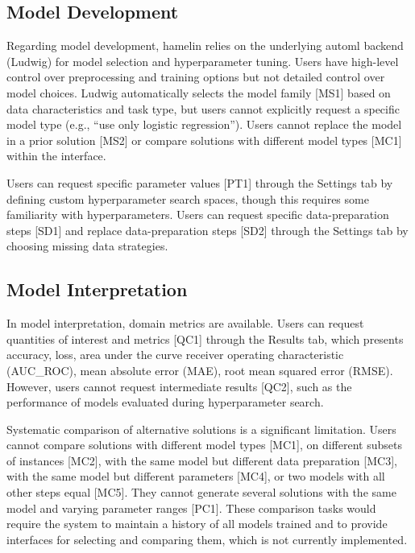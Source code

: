 \documentclass[conference,onecolumn]{IEEEtran}
\begin{document}
\subsection{Model Development}
  
Regarding model development, \gls{hamelin} relies on the underlying \gls{automl} backend (Ludwig) for model selection and hyperparameter tuning. Users have high-level control over preprocessing and training options but not detailed control over model choices. Ludwig automatically selects the model family [MS1] based on data characteristics and task type, but users cannot explicitly request a specific model type (e.g., ``use only logistic regression''). Users cannot replace the model in a prior solution [MS2] or compare solutions with different model types [MC1] within the interface.
  
Users can request specific parameter values [PT1] through the Settings tab by defining custom hyperparameter search spaces, though this requires some familiarity with hyperparameters. Users can request specific data-preparation steps [SD1] and replace data-preparation steps [SD2] through the Settings tab by choosing missing data strategies.
  
\subsection{Model Interpretation}
  
In model interpretation, domain metrics are available. Users can request quantities of interest and metrics [QC1] through the Results tab, which presents accuracy, loss, area under the curve receiver operating characteristic (AUC\_ROC), mean absolute error (MAE), root mean squared error (RMSE). However, users cannot request intermediate results [QC2], such as the performance of models evaluated during hyperparameter search.
  
Systematic comparison of alternative solutions is a significant limitation. Users cannot compare solutions with different model types [MC1], on different subsets of instances [MC2], with the same model but different data preparation [MC3], with the same model but different parameters [MC4], or two models with all other steps equal [MC5]. They cannot generate several solutions with the same model and varying parameter ranges [PC1]. These comparison tasks would require the system to maintain a history of all models trained and to provide interfaces for selecting and comparing them, which is not currently implemented.
\end{document}

